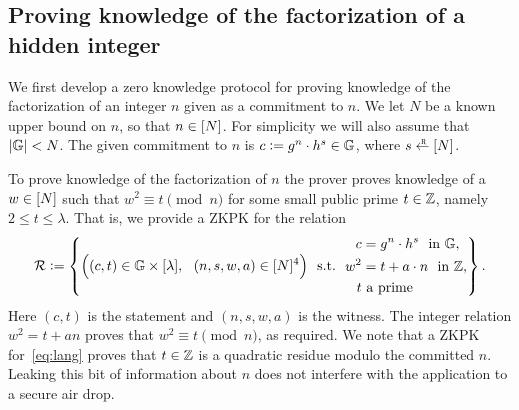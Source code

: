 \documentclass[11pt]{article}
\begin{document}
\subsection{Proving knowledge of the factorization of a hidden integer}

We first develop a zero knowledge protocol for proving
knowledge of the factorization of an integer $n$ given
as a commitment to $n$.
We let $N$ be a known upper bound on $n$, so that $n \in [{N}]$.
For simplicity we will also assume that $\lvert \mathbb G \rvert < N$. 
The given commitment to $n$ is $c \mathrel{\mathop:}= g^n \cdot h^s \in \mathbb G$,
where $s \rgets \range{N}$.

To prove knowledge of the factorization of $n$ the prover
proves knowledge of a $w \in [{N}]$ such that $w^2 \equiv t \pmod{n}$
for some small public prime $t \in \mathbb Z$, namely $2 \leq t \leq \lambda$.
That is, we provide a ZKPK for the relation
\begin{equation} \label{eq:lang}
  {\cal R} \deq \left\{ \Bigl( (c, t) \in \GG \times \range{\lambda},\ \ 
                              (n, s, w, a) \in \range{N}^4 \Bigr)  \ \ 
        \text{s.t.}\ \ 
                \begin{split}
                        c   & = g^n \cdot h^s \ \ \text{in $\GG$}, \\
                        w^2 & = t + a \cdot n \ \ \text{in $\ZZ$}, \\
                        t   & \ \textrm{a prime}
                \end{split}  \right\}.
\end{equation}
Here $(c, t)$ is the statement and $(n, s, w, a)$ is the witness.
The integer relation $w^2 = t + a n$ proves that 
$w^2 \equiv t \pmod{n}$, as required.
We note that a ZKPK for~\eqref{eq:lang} proves that $t \in \mathbb Z$ is a quadratic
residue modulo the committed $n$.  Leaking this bit of information about $n$
does not interfere with the application to a secure air drop.
\end{document}
